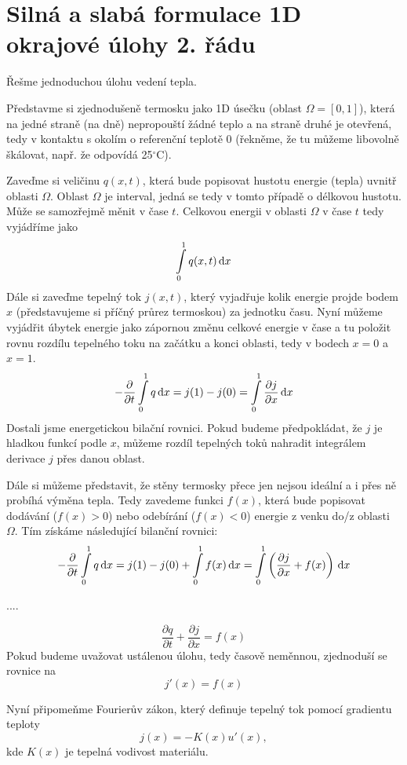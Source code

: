 \section{Silná a slabá formulace 1D okrajové úlohy 2. řádu}

Řešme jednoduchou úlohu vedení tepla. 

Představme si zjednodušeně termosku jako 1D úsečku (oblast $\Omega = [0,1]$),
která na jedné straně (na dně) nepropouští žádné teplo a na straně druhé je otevřená,
tedy v kontaktu s okolím o referenční teplotě 0 (řekněme, že tu můžeme libovolně škálovat, např. že odpovídá 25$^\circ$C).

Zaveďme si veličinu $q(x,t)$, která bude popisovat hustotu energie (tepla) uvnitř oblasti $\Omega$.
Oblast $\Omega$ je interval, jedná se tedy v tomto případě o délkovou hustotu.
Může se samozřejmě měnit v čase $t$.
Celkovou energii v oblasti $\Omega$ v čase $t$ tedy vyjádříme jako
\[
  \int\limits_0^1 q(x,t) \,{\rm d} x
\]
Dále si zaveďme tepelný tok $j(x,t)$, který vyjadřuje kolik energie projde bodem $x$ (představujeme si příčný průrez termoskou)
za jednotku času.
Nyní můžeme vyjádřit úbytek energie jako zápornou změnu celkové energie v čase a tu položit rovnu rozdílu tepelného toku
na začátku a konci oblasti, tedy v bodech $x=0$ a $x=1$.
\[
  -\frac{\partial}{\partial t}\int\limits_0^1 q \,{\rm d} x = j(1) - j(0) = \int\limits_0^1 \frac{\partial j}{\partial x} \,{\rm d} x
\]
Dostali jsme energetickou bilační rovnici. Pokud budeme předpokládat, že $j$ je hladkou funkcí podle $x$, můžeme rozdíl tepelných toků nahradit 
integrálem derivace $j$ přes danou oblast.

Dále si můžeme představit, že stěny termosky přece jen nejsou ideální a i přes ně probíhá výměna tepla.
Tedy zavedeme funkci $f(x)$, která bude popisovat dodávání ($f(x)>0$) nebo odebírání ($f(x)<0$) energie z venku do/z oblasti $\Omega$.
Tím získáme následující bilanční rovnici:
\[
  -\frac{\partial}{\partial t}\int\limits_0^1 q \,{\rm d} x = j(1) - j(0) + \int\limits_0^1 f(x) \,{\rm d} x= \int\limits_0^1 \left(\frac{\partial j}{\partial x} + f(x) \right) \,{\rm d} x
\]

....

\[
  \frac{\partial q}{\partial t} + \frac{\partial j}{\partial x} = f(x)
\]
Pokud budeme uvažovat ustálenou úlohu, tedy časově neměnnou, zjednoduší se rovnice na
\begin{equation}
  j'(x) = f(x) \label{eqn:continuity_steady_1d}
\end{equation}

Nyní připomeňme Fourierův zákon, který definuje tepelný tok pomocí gradientu teploty
\begin{equation}
j(x) = -K(x)u'(x), \label{eqn:fourier_1d}
\end{equation}
kde $K(x)$ je tepelná vodivost materiálu.


